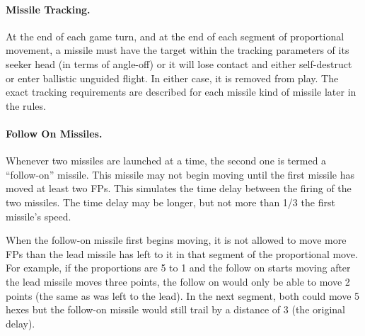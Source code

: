 \paragraph{Missile Tracking.} At the end of each game turn, and at the end of each segment of proportional movement, a missile must have the target within the tracking parameters of its seeker head (in terms of angle-off) or it will lose contact and either self-destruct or enter ballistic unguided flight. In either case, it is removed from play. The exact tracking requirements are described for each missile kind of missile later in the rules.


\paragraph{Follow On Missiles.} Whenever two missiles are launched at a time, the second one is termed a “follow-on” missile. This missile may not begin moving until the first missile has moved at least two FPs. This simulates the time delay between the firing of the two missiles. The time delay may be longer, but not more than 1/3 the first missile's speed.

When the follow-on missile first begins moving, it is not allowed to move more FPs than the lead missile has left to it in that segment of the proportional move. For example, if the proportions are 5 to 1 and the follow on starts moving after the lead missile moves three points, the follow on would only be able to move 2 points (the same as was left to the lead). In the next segment, both could move 5 hexes but the follow-on missile would still trail by a distance of 3 (the original delay).

